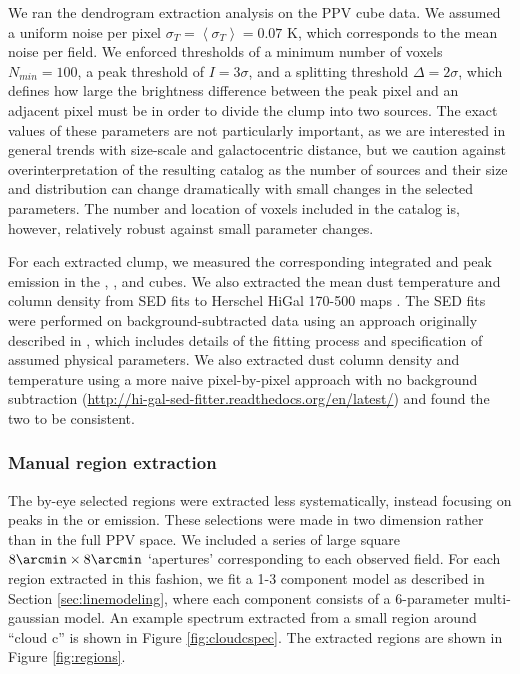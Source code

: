 
We ran the dendrogram extraction analysis on the 
\threeohthree PPV cube data.  We assumed a uniform noise per pixel
$\sigma_{T}=\left<\sigma_T\right>=0.07$ K, which corresponds to the mean noise
per field.  We enforced thresholds of a minimum number of
voxels $N_{min}=100$, a peak threshold of $I = 3\sigma$, and a splitting
threshold $\Delta = 2\sigma$, which defines how large the brightness difference
between
the peak pixel and an adjacent pixel must be in order to divide the clump into two
sources.  The exact values of these parameters are not particularly
important, as we are interested in general trends with size-scale and
galactocentric distance, but we caution against overinterpretation of the
resulting catalog as the number of sources and their size and distribution can
change dramatically with small changes in the selected parameters.  The number
and location of voxels included in the catalog is, however, relatively robust
against small parameter changes.

For each extracted clump, we measured the corresponding integrated and peak
emission in the \threeohthree, \threetwoone, and \thirteenco cubes.  We also extracted the mean
dust temperature and column density from SED fits to Herschel HiGal 170-500\um
maps \citep{Molinari2010a,Traficante2011a}.  The SED fits were performed on
background-subtracted data using an approach originally described in
\citet{Battersby2011a}, which includes details of the fitting process and
specification of assumed physical parameters.  We also extracted dust column
density and temperature using a more naive pixel-by-pixel approach with no
background subtraction
(\url{http://hi-gal-sed-fitter.readthedocs.org/en/latest/}) and found the two
to be consistent.

\subsubsection{Manual region extraction}
\label{sec:byeye}
The by-eye selected regions were extracted less systematically, instead
focusing on peaks in the \threeohthree or \threetwoone emission.  These
selections were made in two dimension rather than in the full PPV space.  We
included a series of large square $8\arcmin \times 8\arcmin$ `apertures'
corresponding to each observed field.  For each region extracted in this
fashion, we fit a 1-3 component model as described in Section
\ref{sec:linemodeling}, where each component consists of a 6-parameter
multi-gaussian model.  An example spectrum extracted from a small region around
``cloud c'' is shown in Figure \ref{fig:cloudcspec}.  The extracted regions are
shown in Figure \ref{fig:regions}.

